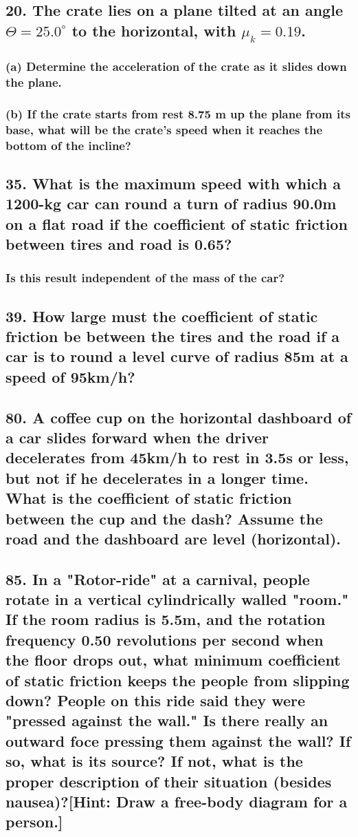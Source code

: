\documentclass[12pt,a4paper,english]{article}
\newcommand{\degree}[1]{${#1}^\circ$}
\begin{document}
\begin{flushleft}
  \subsection{20. The crate lies on a plane tilted at an angle $\Theta=$\degree{25.0} to the horizontal, with $\mu_k=0.19$.}
  \subsubsection{(a) Determine the acceleration of the crate as it slides down the plane.}
  \subsubsection{(b) If the crate starts from rest 8.75 m up the plane from its base, what will be the crate's speed when it reaches the bottom of the incline?}
  \subsection{35. What is the maximum speed with which a 1200-kg car can round a turn of radius 90.0m on a flat road if the coefficient of static friction between tires and road is 0.65? }
  \subsubsection{Is this result independent of the mass of the car?}
  \subsection{39. How large must the coefficient of static friction be between the tires and the road if a car is to round a level curve of radius 85m at a speed of 95km/h?}
  \subsection{80. A coffee cup on the horizontal dashboard of a car slides forward when the driver decelerates from 45km/h to rest in 3.5s or less, but not if he decelerates in a longer time. What is the coefficient of static friction between the cup and the dash? Assume the road and the dashboard are level (horizontal).}
  \subsection{85. In a "Rotor-ride" at a carnival, people rotate in a vertical cylindrically walled "room." If the room radius is 5.5m, and the rotation frequency 0.50 revolutions per second when the floor drops out, what minimum coefficient of static friction keeps the people from slipping down? People on this ride said they were "pressed against the wall." Is there really an outward foce pressing them against the wall? If so, what is its source? If not, what is the proper description of their situation (besides nausea)?[Hint: Draw a free-body diagram for a person.]}
\end{flushleft}
\end{document}
